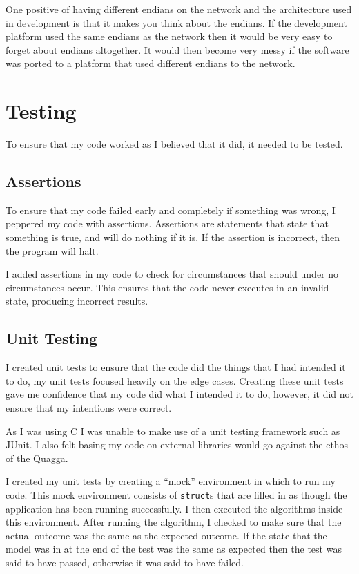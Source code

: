 \documentclass[12pt]{report}
\begin{document}
One positive of having different endians on the network and the architecture
used in development is that it makes you think about the endians. If the
development platform used the same endians as the network then it would be very
easy to forget about endians altogether. It would then become very messy if the
software was ported to a platform that used different endians to the network.
    
\chapter{Testing}
To ensure that my code worked as I believed that it did, it needed to be
tested. 

\section{Assertions}
To ensure that my code failed early and completely if something was wrong, I
peppered my code with assertions. Assertions are statements that state that
something is true, and will do nothing if it is. If the assertion is incorrect,
then the program will halt.

I added assertions in my code to check for circumstances that should under no
circumstances occur. This ensures that the code never executes in an invalid
state, producing incorrect results. 

\section{Unit Testing}
I created unit tests to ensure that the code did the things that I had intended
it to do, my unit tests focused heavily on the edge cases. Creating these unit
tests gave me confidence that my code did what I intended it to do, however, it
did not ensure that my intentions were correct. 

As I was using C I was unable to make use of a unit testing framework such as
JUnit. I also felt basing my code on external libraries would go against
the ethos of the Quagga.

I created my unit tests by creating a ``mock'' environment in which to run my
code. This mock environment consists of \texttt{struct}s that are filled in as
though the application has been running successfully.  I then executed the
algorithms inside this environment. After running the algorithm, I checked to
make sure that the actual outcome was the same as the expected outcome. If the
state that the model was in at the end of the test was the same as expected
then the test was said to have passed, otherwise it was said to have failed. 
\end{document}
